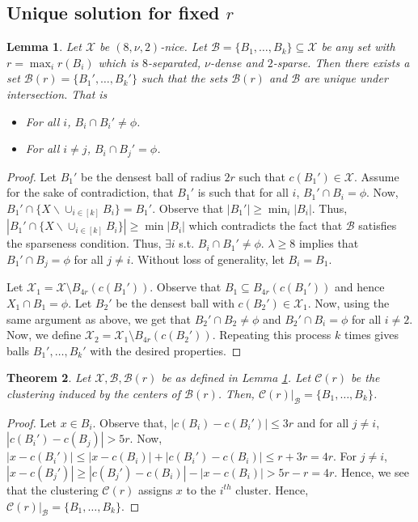 \documentclass[twoside]{article}
\newcommand{\mc}{\mathcal}
\newtheorem{theorem}{Theorem}
\newtheorem{lemma}[theorem]{Lemma}
\begin{document}
\subsection{Unique solution for fixed $r$}
\label{section:uniqueR}
\begin{lemma}
\label{lemma:uniqueR}
Let $\mc X$ be $(8, \nu, 2)$-nice. Let $\mc B = \{B_1,\ldots, B_k\} \subseteq \mc X$ be any set with $r = \max_i r(B_i)$ which is $8$-separated, $\nu$-dense and $2$-sparse. Then there exists a set $\mc B(r) = \{B_1',\ldots,B_k'\}$ such that the sets $\mc B(r)$ and $\mc B$ are unique under intersection. That is 
\begin{itemize}[nolistsep]
\item For all $i$, $B_i \cap B_i' \neq \phi$. 
\item For all $i\neq j$, $B_i \cap B_j' = \phi$.
\end{itemize}
\end{lemma} 
\begin{proof}
Let $B_1'$ be the densest ball of radius $2r$ such that $c(B_1') \in \mc X$. Assume for the sake of contradiction, that $B_1'$ is such that for all $i$, $B_1' \cap B_i = \phi$. Now, $B_1' \cap \{X \backslash \cup_{i\in[k]} B_i\} = B_1'$. Observe that $|B_1'| \ge \min_i |B_i|$. Thus, $|B_1' \cap \{X \backslash \cup_{i\in[k]} B_i\}| \ge \min |B_i|$ which contradicts the fact that $\mc B$ satisfies the sparseness condition. Thus, $\exists i$ s.t. $B_i \cap B_1' \neq \phi$. $\lambda \ge 8$ implies that $B_1' \cap B_j = \phi$ for all $j \neq i$. Without loss of generality, let $B_i = B_1$. 

Let $\mc X_1 = \mc X \setminus B_{4r}(c(B_1'))$. Observe that $B_1 \subseteq B_{4r}(c(B_1'))$ and hence $X_1 \cap B_1 = \phi$. Let $B_2'$ be the densest ball with $c(B_2') \in \mc X_1$. Now, using the same argument as above, we get that $B_2' \cap B_2 \neq \phi$ and $B_2' \cap B_i = \phi$ for all $i\neq 2$. Now, we define $\mc X_2 = \mc X_1 \setminus B_{4r}(c(B_2'))$. Repeating this process $k$ times gives balls $B_1', \ldots, B_k'$ with the desired properties.
\end{proof}

\begin{theorem}
\label{theorem:uniqueR}
Let $\mc X, \mc B, \mc B(r)$ be as defined in Lemma \ref{lemma:uniqueR}. Let $\mc C(r)$ be the clustering induced by the centers of $\mc B(r)$. Then, $\mc C(r)|_{\mc B} = \{B_1, \ldots, B_k\}$. 
\end{theorem}
\begin{proof}
Let $x \in B_i$. Observe that, $|c(B_i)-c(B_i')| \le 3r$ and for all $j\neq i$, $|c(B_i')-c(B_j)| > 5r$. Now, $|x-c(B_i')| \le |x-c(B_i)| + |c(B_i')-c(B_i)| \le r+3r = 4r$. For $j \neq i$, $|x-c(B_j')| \ge |c(B_j')-c(B_i)| - |x-c(B_i)| > 5r - r = 4r$. Hence, we see that the clustering $\mc C(r)$ assigns $x$ to the $i^{th}$ cluster. Hence, $\mc C(r)|_\mc B = \{B_1,\ldots,B_k\}$.
\end{proof}
\end{document}
